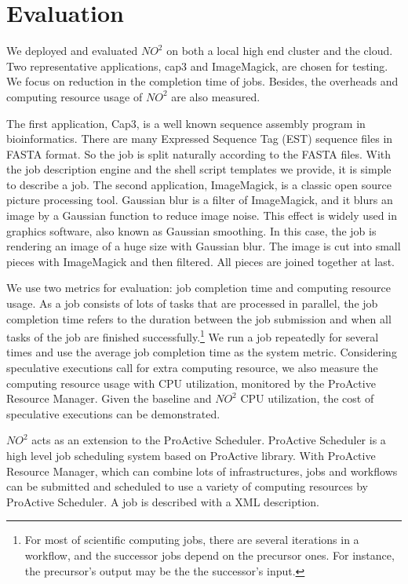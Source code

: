 \section{Evaluation}
We deployed and evaluated $NO^2$ on both a local high end cluster and the cloud. Two
representative applications, cap3 and ImageMagick, are chosen for testing. We focus on
reduction in the completion time of jobs. Besides, the overheads and computing resource usage of $NO^2$ are also measured.

The first application, Cap3, is a well known sequence assembly program in bioinformatics. There are many Expressed Sequence Tag (EST) sequence files in
FASTA format. So the job is split naturally according to the FASTA files. With the job
description engine and the shell script templates we provide, it is
simple to describe a job. The second application, ImageMagick, is a classic open
source picture processing tool. Gaussian blur is a filter of ImageMagick, and it blurs an
image by a Gaussian function to reduce image noise. This effect is widely used in graphics
software, also known as Gaussian smoothing. In this case, the job is rendering an image of
a huge size with Gaussian blur. The image is cut into small pieces with ImageMagick and
then filtered. All pieces are joined together at last.

We use two metrics for evaluation: job completion time and computing resource usage. As a
job consists of lots of tasks that are processed in parallel, the job completion time refers
to the duration between the job submission and when all tasks of the job are finished
successfully.\footnote{For most of scientific computing jobs, there are several iterations
in a workflow, and the successor jobs depend on the precursor ones. For instance, the
precursor's output may be the the successor's input.} We run a job repeatedly for several
times and use the average job completion time as the system metric. Considering
speculative executions call for extra computing resource, we also measure the computing
resource usage with CPU utilization, monitored by the ProActive Resource Manager. Given
the baseline and $NO^2$ CPU utilization, the cost of speculative executions can be
demonstrated.

$NO^2$ acts as an extension to the ProActive Scheduler. ProActive Scheduler is a high
level job scheduling system based on ProActive library. With ProActive Resource Manager,
which can combine lots of infrastructures, jobs and workflows can be submitted and
scheduled to use a variety of computing resources by ProActive Scheduler. A job is
described with a XML description.


